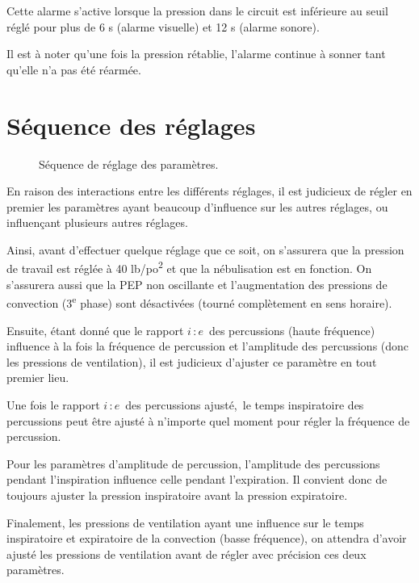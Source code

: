 \documentclass[letterpaper, titlepage]{article}
\def\ie{$i\, \colon e$}
\begin{document}
Cette alarme s'active lorsque la pression dans le circuit est inférieure
au seuil réglé pour plus de 6 s (alarme visuelle) et 12 s (alarme
sonore).

Il est à noter qu'une fois la pression rétablie, l'alarme continue à
sonner tant qu'elle n'a pas été réarmée.

\section{Séquence des réglages}

\begin{figure*}
	
	\caption{Séquence de réglage des paramètres.}
\end{figure*}

En raison des interactions entre les différents réglages, il est
judicieux de régler en premier les paramètres ayant beaucoup d'influence
sur les autres réglages, ou influençant plusieurs autres réglages.

Ainsi, avant d'effectuer quelque réglage que ce soit, on s'assurera que
la pression de travail est réglée à 40 lb/po\textsuperscript{2} et que la nébulisation est
en fonction. On s'assurera aussi que la PEP non oscillante et
l'augmentation des pressions de convection (3\textsuperscript{e} phase) sont désactivées
(tourné complètement en sens horaire).

Ensuite, étant donné que le rapport \ie\ des percussions (haute
fréquence) influence à la fois la fréquence de percussion et l'amplitude
des percussions (donc les pressions de ventilation), il est judicieux
d'ajuster ce paramètre en tout premier lieu.

Une fois le rapport \ie\ des percussions ajusté,~le temps inspiratoire
des percussions peut être ajusté à n'importe quel moment pour régler la
fréquence de percussion.

Pour les paramètres d'amplitude de percussion, l'amplitude des
percussions pendant l'inspiration influence celle pendant l'expiration.
Il convient donc de toujours ajuster la pression inspiratoire avant la
pression expiratoire.

Finalement, les pressions de ventilation ayant une influence sur le
temps inspiratoire et expiratoire de la convection (basse fréquence),
on attendra d'avoir ajusté les pressions de ventilation avant de régler
avec précision ces deux paramètres.~
\end{document}
